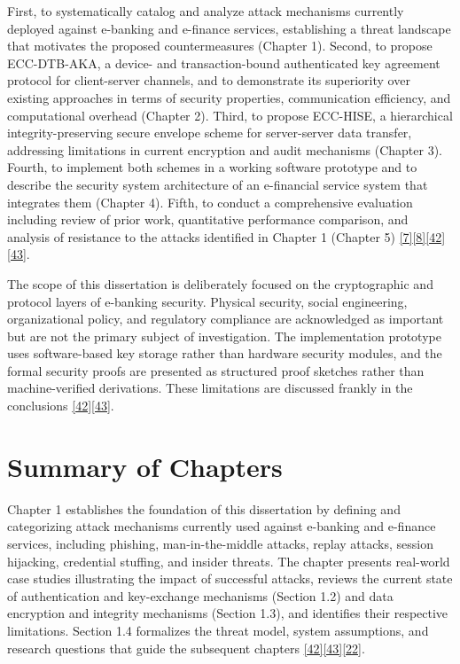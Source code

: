 \indent First, to systematically catalog and analyze attack mechanisms currently deployed against e-banking and e-finance services, establishing a threat landscape that motivates the proposed countermeasures (Chapter 1). Second, to propose ECC-DTB-AKA, a device- and transaction-bound authenticated key agreement protocol for client-server channels, and to demonstrate its superiority over existing approaches in terms of security properties, communication efficiency, and computational overhead (Chapter 2). Third, to propose ECC-HISE, a hierarchical integrity-preserving secure envelope scheme for server-server data transfer, addressing limitations in current encryption and audit mechanisms (Chapter 3). Fourth, to implement both schemes in a working software prototype and to describe the security system architecture of an e-financial service system that integrates them (Chapter 4). Fifth, to conduct a comprehensive evaluation including review of prior work, quantitative performance comparison, and analysis of resistance to the attacks identified in Chapter 1 (Chapter 5) \hyperref[ref:7]{[7]}\hyperref[ref:8]{[8]}\hyperref[ref:42]{[42]}\hyperref[ref:43]{[43]}.

\indent The scope of this dissertation is deliberately focused on the cryptographic and protocol layers of e-banking security. Physical security, social engineering, organizational policy, and regulatory compliance are acknowledged as important but are not the primary subject of investigation. The implementation prototype uses software-based key storage rather than hardware security modules, and the formal security proofs are presented as structured proof sketches rather than machine-verified derivations. These limitations are discussed frankly in the conclusions \hyperref[ref:42]{[42]}\hyperref[ref:43]{[43]}.

\section{Summary of Chapters}

\indent Chapter 1 establishes the foundation of this dissertation by defining and categorizing attack mechanisms currently used against e-banking and e-finance services, including phishing, man-in-the-middle attacks, replay attacks, session hijacking, credential stuffing, and insider threats. The chapter presents real-world case studies illustrating the impact of successful attacks, reviews the current state of authentication and key-exchange mechanisms (Section 1.2) and data encryption and integrity mechanisms (Section 1.3), and identifies their respective limitations. Section 1.4 formalizes the threat model, system assumptions, and research questions that guide the subsequent chapters \hyperref[ref:42]{[42]}\hyperref[ref:43]{[43]}\hyperref[ref:22]{[22]}.

